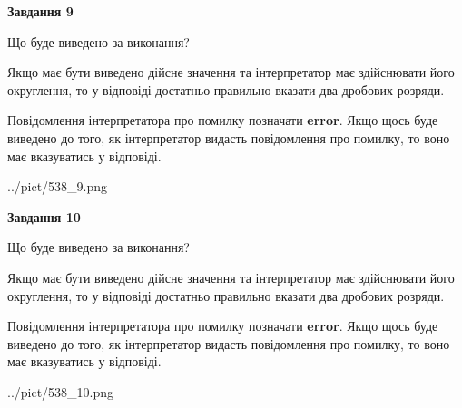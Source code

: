 \documentclass[12pt, ukrainian]{article}
\begin{document}
{\begin {Large}
{\begin {center}\textbf{Завдання 9}\end {center}}\par
Що буде виведено за виконання? \par

Якщо має бути виведено дійсне значення та інтерпретатор має здійснювати його округлення, 
то у відповіді достатньо правильно вказати два дробових розряди.

Повідомлення інтерпретатора про помилку позначати \textbf{error}.
Якщо щось буде виведено до того, як інтерпретатор видасть повідомлення про помилку, 
то воно має вказуватись у відповіді. \par

\begin{center}
	{../pict/538_9.png}
\end{center}
\newpage

{\begin {center}\textbf{Завдання 10}\end {center}}\par
Що буде виведено за виконання? \par

Якщо має бути виведено дійсне значення та інтерпретатор має здійснювати його округлення, 
то у відповіді достатньо правильно вказати два дробових розряди.

Повідомлення інтерпретатора про помилку позначати \textbf{error}.
Якщо щось буде виведено до того, як інтерпретатор видасть повідомлення про помилку, 
то воно має вказуватись у відповіді. \par

\begin{center}
	{../pict/538_10.png}
\end{center}
\newpage

\end {Large}}
\end{document}
